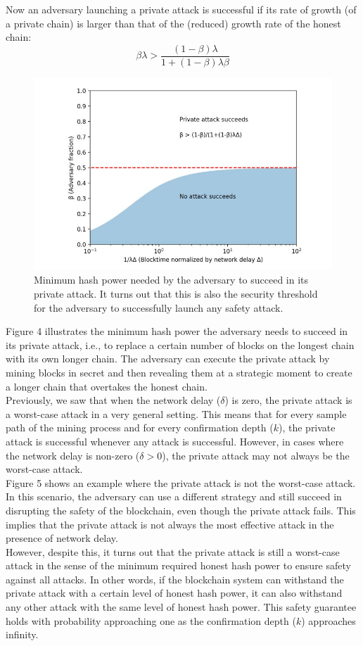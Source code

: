 \documentclass{report}
\begin{document}
Now an adversary launching a private attack is successful if its rate of growth (of a private chain) is larger than that of the (reduced) growth rate of the honest chain:
\begin{equation}
	\beta \lambda > \frac{(1 - \beta) \lambda}{1 + (1 - \beta) \lambda \beta}
\end{equation}
\begin{figure}[h!]
	\centering
	\includegraphics[width=0.6\linewidth]{Fig/F4}
	\caption{Minimum hash power needed by the adversary to succeed in its private attack. It turns
		out that this is also the security threshold for the adversary to successfully launch any safety attack.}
	\label{fig:f1}
\end{figure}
Figure 4 illustrates the minimum hash power the adversary needs to succeed in its private attack, i.e., to replace a certain number of blocks on the longest chain with its own longer chain. The adversary can execute the private attack by mining blocks in secret and then revealing them at a strategic moment to create a longer chain that overtakes the honest chain.\\
Previously, we saw that when the network delay ($\delta$) is zero, the private attack is a worst-case attack in a very general setting. This means that for every sample path of the mining process and for every confirmation depth ($k$), the private attack is successful whenever any attack is successful. However, in cases where the network delay is non-zero ($\delta > 0$), the private attack may not always be the worst-case attack.\\
Figure 5 shows an example where the private attack is not the worst-case attack. In this scenario, the adversary can use a different strategy and still succeed in disrupting the safety of the blockchain, even though the private attack fails. This implies that the private attack is not always the most effective attack in the presence of network delay.\\
However, despite this, it turns out that the private attack is still a worst-case attack in the sense of the minimum required honest hash power to ensure safety against all attacks. In other words, if the blockchain system can withstand the private attack with a certain level of honest hash power, it can also withstand any other attack with the same level of honest hash power. This safety guarantee holds with probability approaching one as the confirmation depth ($k$) approaches infinity.\\
\end{document}
